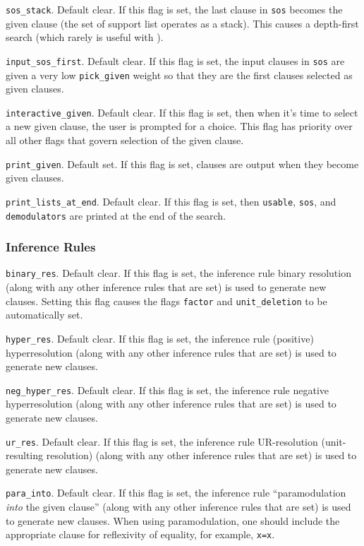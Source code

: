 \documentclass[11pt]{article}
\begin{document}
\noindent
\verb:sos_stack:.  Default clear.  If this flag is set,
the last clause in \verb:sos: becomes the given clause (the set
of support list operates as a stack).  This causes a depth-first
search (which rarely is useful with \otter).

\noindent
\verb:input_sos_first:.  Default clear.  If this flag is set, the
input clauses in \verb:sos: are given a very low \verb:pick_given:
weight so that they are the first clauses selected as given clauses.

\noindent
\verb:interactive_given:.  Default clear.  If this flag is set,
then when it's time to select a new given clause,
the user is prompted for a choice.  This flag has priority
over all other flags that govern selection of the given clause.

\noindent
\verb:print_given:.  Default set.  If this flag is set, clauses are
output when they become given clauses.

\noindent
\verb:print_lists_at_end:.  Default clear.  If this flag is set,
then \verb:usable:, \verb:sos:, and \verb:demodulators: are printed at
the end of the search.

\subsubsection{Inference Rules} \label{inf-flags}

\verb:binary_res:.  Default clear.  If this flag is set,
the inference rule binary
resolution (along with any other inference rules that are set)
is used to generate new clauses.
Setting this flag causes the flags \verb:factor: and
\verb:unit_deletion: to be automatically set.

\noindent
\verb:hyper_res:.  Default clear.  If this flag is set,
the inference rule (positive) hyperresolution (along with any
other inference rules that are set) is used to generate new clauses.

\noindent
\verb:neg_hyper_res:.  Default clear.  If this flag is set,
the inference rule negative hyperresolution (along with any
other inference rules that are set) is used to generate new clauses.

\noindent
\verb:ur_res:.  Default clear.  If this flag is set,
the inference rule UR-resolution (unit-resulting resolution)
(along with any other inference rules that are set) is used
to generate new clauses.

\noindent
\verb:para_into:.  Default clear.  If this flag is set,
the inference rule ``paramodulation {\it into} the given clause''
(along with any other inference rules that are set) is used to
generate new clauses.  When using paramodulation, one should include
the appropriate clause for reflexivity of equality, for example, \verb:x=x:.
\end{document}
